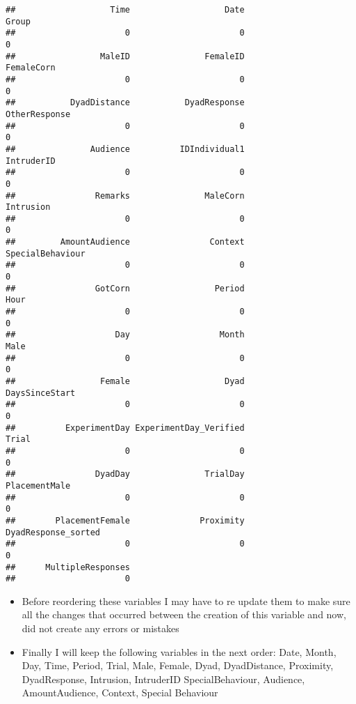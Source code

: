 \documentclass[
]{article}
\begin{document}
\begin{verbatim}
##                   Time                   Date                  Group 
##                      0                      0                      0 
##                 MaleID               FemaleID             FemaleCorn 
##                      0                      0                      0 
##           DyadDistance           DyadResponse          OtherResponse 
##                      0                      0                      0 
##               Audience          IDIndividual1             IntruderID 
##                      0                      0                      0 
##                Remarks               MaleCorn              Intrusion 
##                      0                      0                      0 
##         AmountAudience                Context       SpecialBehaviour 
##                      0                      0                      0 
##                GotCorn                 Period                   Hour 
##                      0                      0                      0 
##                    Day                  Month                   Male 
##                      0                      0                      0 
##                 Female                   Dyad         DaysSinceStart 
##                      0                      0                      0 
##          ExperimentDay ExperimentDay_Verified                  Trial 
##                      0                      0                      0 
##                DyadDay               TrialDay          PlacementMale 
##                      0                      0                      0 
##        PlacementFemale              Proximity    DyadResponse_sorted 
##                      0                      0                      0 
##      MultipleResponses 
##                      0
\end{verbatim}

\begin{itemize}
\item
  Before reordering these variables I may have to re update them to make
  sure all the changes that occurred between the creation of this
  variable and now, did not create any errors or mistakes
\item
  Finally I will keep the following variables in the next order: Date,
  Month, Day, Time, Period, Trial, Male, Female, Dyad, DyadDistance,
  Proximity, DyadResponse, Intrusion, IntruderID SpecialBehaviour,
  Audience, AmountAudience, Context, Special Behaviour
\end{itemize}
\end{document}
